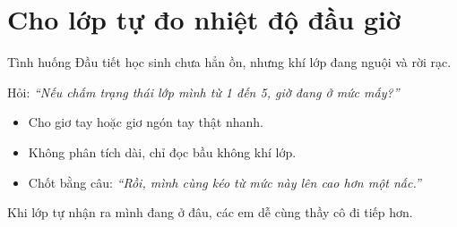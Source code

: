 \section{Cho lớp tự đo nhiệt độ đầu giờ}
\begin{tinhhuong}{Tình huống}
Đầu tiết học sinh chưa hẳn ồn, nhưng khí lớp đang nguội và rời rạc.
\end{tinhhuong}
\begin{goiydungngay}
Hỏi: \textit{``Nếu chấm trạng thái lớp mình từ 1 đến 5, giờ đang ở mức mấy?''}
\begin{itemize}
\item Cho giơ tay hoặc giơ ngón tay thật nhanh.
\item Không phân tích dài, chỉ đọc bầu không khí lớp.
\item Chốt bằng câu: \textit{``Rồi, mình cùng kéo từ mức này lên cao hơn một nấc.''}
\end{itemize}
\end{goiydungngay}
\begin{cauchot}
Khi lớp tự nhận ra mình đang ở đâu, các em dễ cùng thầy cô đi tiếp hơn.
\end{cauchot}
